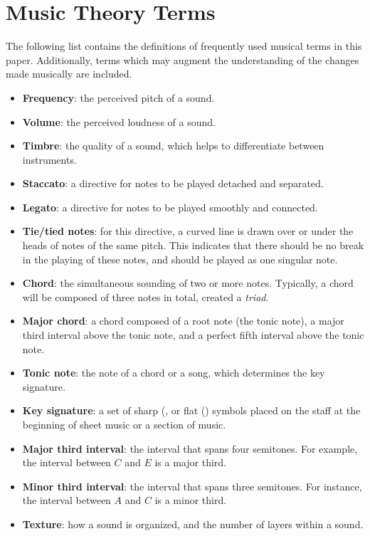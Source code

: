 \chapter{Music Theory Terms}\label{appendix:music-theory-terms}
The following list contains the definitions of frequently used musical terms in this paper. Additionally, terms which may augment the understanding of the changes made musically are included. 
\begin{itemize}
    \item {\textbf{Frequency}: the perceived pitch of a sound.}
    \item {\textbf{Volume}: the perceived loudness of a sound.}
    \item {\textbf{Timbre}: the quality of a sound, which helps to differentiate between instruments.}
    \item {\textbf{Staccato}: a directive for notes to be played detached and separated.}
    \item {\textbf{Legato}: a directive for notes to be played smoothly and connected.}
    \item {\textbf{Tie/tied notes}: for this directive, a curved line is drawn over or under the heads of notes of the same pitch. This indicates that there should be no break in the playing of these notes, and should be played as one singular note.}
    \item {\textbf{Chord}: the simultaneous sounding of two or more notes. Typically, a chord will be composed of three notes in total, created a \textit{triad}.}
    \item {\textbf{Major chord}: a chord composed of a root note (the tonic note), a major third interval above the tonic note, and a perfect fifth interval above the tonic note.}
    \item {\textbf{Tonic note}: the note of a chord or a song, which determines the key signature.}
    \item {\textbf{Key signature}: a set of sharp (\musSharp{}, or flat (\musFlat{}) symbols placed on the staff at the beginning of sheet music or a section of music.}
    \item {\textbf{Major third interval}: the interval that spans four semitones. For example, the interval between $C$ and $E$ is a major third.}
    \item {\textbf{Minor third interval}: the interval that spans three semitones. For instance, the interval between $A$ and $C$ is a minor third.}
    \item {\textbf{Texture}: how a sound is organized, and the number of layers within a sound.}

\end{itemize}
